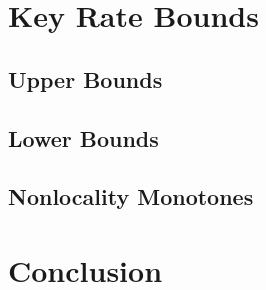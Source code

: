 \documentclass[xcolor=dvipsnames]{beamer}
\newcommand{\?}{\mathrel{?}} %
\begin{document}
\section{Key Rate Bounds}

\subsection{Upper Bounds}

\subsection{Lower Bounds}

\subsection{Nonlocality Monotones}

\section*{Conclusion}
\end{document}
